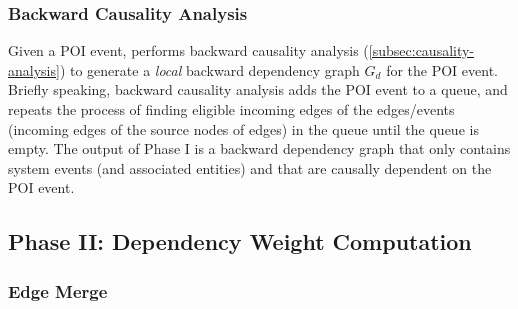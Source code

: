 \subsubsection{Backward Causality Analysis}
\label{subsubsec:backward-causality}

Given a POI event, \tool performs backward causality analysis (\cref{subsec:causality-analysis}) to generate a \emph{local} backward dependency graph $G_d$ for the POI event.
%
Briefly speaking, backward causality analysis adds the POI event to a queue, and repeats the process of finding eligible incoming edges of the edges/events (\ie incoming edges of the source nodes of edges) in the queue until the queue is empty. 
The output of Phase I is a backward dependency graph that only contains system events (and associated entities) and that are causally dependent on the POI event.

%





\subsection{Phase II: Dependency Weight Computation}
\label{subsec:phase2}

\subsubsection{Edge Merge}
\label{subsubsec:edge-merge}

